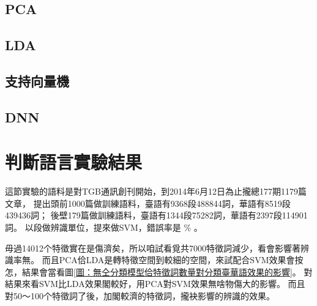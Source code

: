 \documentclass[final,oneside,onecolumn,12pt,a4paper]{book}%
\begin{document}
\subsection{PCA}
\label{節：PCA}

\subsection{LDA}
\label{節：LDA}

\subsection{支持向量機}
\label{節：支持向量機}

\subsection{DNN}
\label{節：DNN}


\section{判斷語言實驗結果}
\label{節：判斷語言實驗結果}
這節實驗的語料是對TGB通訊創刊開始，到2014年6月12日為止攏總177期1179篇文章，
提出頭前1000篇做訓練語料，臺語有9368段488844詞，華語有8519段439436詞；
後壁179篇做訓練語料，臺語有1344段75282詞，華語有2397段114901詞。
以段做辨識單位，提來做SVM，錯誤率是 $\%$ 。

毋過14012个特徵實在是傷濟矣，所以咱試看覓共7000特徵詞減少，看會影響著辨識率無。
而且PCA佮LDA是轉特徵空間到較細的空間，來試配合SVM效果會按怎，結果會當看圖\ref{圖：無仝分類模型佮特徵詞數量對分類臺華語效果的影響}。
對結果來看SVM比LDA效果閣較好，用PCA對SVM效果無啥物傷大的影響。
而且對50～100个特徵詞了後，加閣較濟的特徵詞，攏袂影響的辨識的效果。
\end{document}
